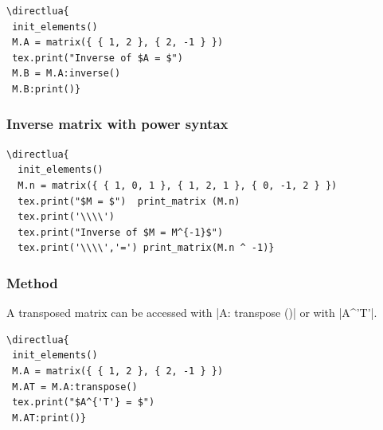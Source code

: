 \begin{minipage}{.6\textwidth}
\begin{verbatim}
\directlua{
 init_elements()
 M.A = matrix({ { 1, 2 }, { 2, -1 } })
 tex.print("Inverse of $A = $")
 M.B = M.A:inverse()
 M.B:print()}
\end{verbatim}
\end{minipage}
\begin{minipage}{.4\textwidth}
\end{minipage}

\subsubsection{Inverse matrix with power syntax}
\label{ssub:inverse_matrix_with_power_syntax}

\begin{minipage}{.6\textwidth}
\begin{verbatim}
\directlua{
  init_elements()
  M.n = matrix({ { 1, 0, 1 }, { 1, 2, 1 }, { 0, -1, 2 } })
  tex.print("$M = $")  print_matrix (M.n)
  tex.print('\\\\')
  tex.print("Inverse of $M = M^{-1}$")
  tex.print('\\\\','=') print_matrix(M.n ^ -1)}
\end{verbatim}
\end{minipage}
\begin{minipage}{.4\textwidth}
\end{minipage}

\subsubsection{Method  }
\label{ssub:transpose_matrix}

A transposed matrix can be accessed with |A: transpose ()| or with |A^{'T'}|.

\vspace{.5em}
\begin{minipage}{.6\textwidth}
\begin{verbatim}
\directlua{
 init_elements()
 M.A = matrix({ { 1, 2 }, { 2, -1 } })
 M.AT = M.A:transpose()
 tex.print("$A^{'T'} = $")
 M.AT:print()}
\end{verbatim}
\end{minipage}
\begin{minipage}{.4\textwidth}
\end{minipage}

